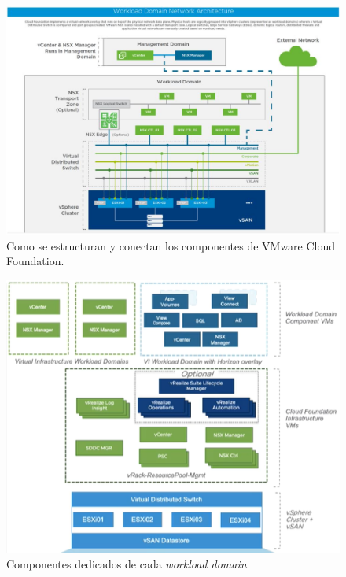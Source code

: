 \begin{figure}[h!]
  \centering
  \includegraphics[width=1\textwidth]{imaxes/conceptosPrevios/WDomainStructure.JPG}
  \caption{Como se estructuran y conectan los componentes de VMware Cloud Foundation.}
  \label{fig:esquemaCFDominios}
\end{figure}
\begin{figure}[h!]
  \centering
  \includegraphics[width=1\textwidth]{imaxes/conceptosPrevios/workloadDomains.png}
  \caption{Componentes dedicados de cada \textit{workload domain}.}
  \label{fig:esquemaCFComponentes}
\end{figure}


\FloatBarrier

